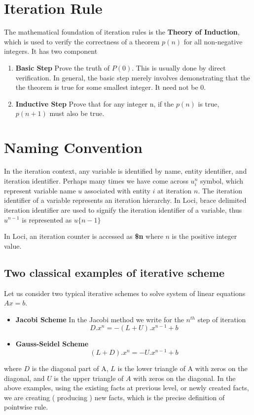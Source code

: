 \section { Iteration Rule }
The mathematical foundation of iteration rules is the {\bf Theory of Induction},
which is used to verify the correctness of a theorem $p(n)$ for all non-negative
integers.
It has two component
\begin{enumerate}
\item {\bf Basic Step}  Prove the truth of $P(0)$. This is usually done by direct
verification. In general, the basic step merely involves demonstrating that the
the theorem is true for some smallest integer. It need not be $0$.
\item {\bf Inductive Step} Prove that for any integer n, if the $p(n)$ is true,
$p(n+1)$ must also be true. 
\end{enumerate}

\section{Naming Convention}
\par In the iteration context, any variable is identified by name, 
entity identifier, and iteration identifier. Perhaps many times
we have come across $u_i^n$ symbol, which represent variable
name $u$ associated with entity $i$ at iteration $n$. The iteration
identifier of a variable represents an iteration hierarchy. In Loci,
brace delimited iteration identifier are used to signify the iteration
identifier of a variable, thus $u^{n-1}$ is represented as $u\{n-1\}$

\par In Loci, an iteration counter is accessed as {\bf \$n} where $n$ is
the positive integer value.

\subsection { Two classical examples of iterative scheme }
Let us consider two typical iterative schemes to solve system
of linear equations $Ax=b$.
\begin{itemize}
\item {\bf Jacobi Scheme} In the Jacobi method we write for the $n^{th}$ step of
iteration 
\begin{equation}
 D. x^n = -(L+U). x^{n-1} + b
\end{equation}
\item {\bf Gauss-Seidel Scheme}
\begin{equation}
 (L+D).x^n = -U.x^{n-1} + b
\end{equation}
\end{itemize}
\par where $D$ is the diagonal part of A, $L$ is the lower triangle of A with 
zeros on the diagonal,  and $U$ is the upper triangle of $A$ with zeros on the
diagonal.
%
In the above examples, using the existing facts at previous level, or newly 
created facts, we are creating ( producing ) new facts, which is the precise
definition of pointwise rule.
%
